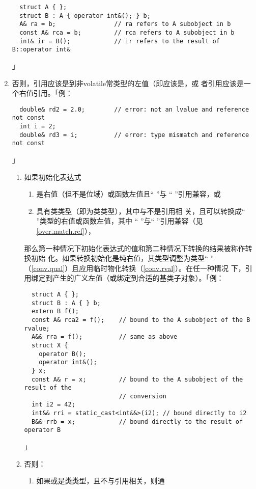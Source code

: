 \begin{enumerate}
{\begin{lstlisting}
  struct A { };
  struct B : A { operator int&(); } b;
  A& ra = b;                // ra refers to A subobject in b
  const A& rca = b;         // rca refers to A subobject in b
  int& ir = B();            // ir refers to the result of B::operator int&
\end{lstlisting}」}
  \item{否则，引用应该是到非volatile常类型的左值（即应该是，或
    者引用应该是一个右值引用。「例：
\begin{lstlisting}
  double& rd2 = 2.0;        // error: not an lvalue and reference not const
  int i = 2;
  double& rd3 = i;          // error: type mismatch and reference not const
\end{lstlisting}」
    \begin{enumerate}
      \item{如果初始化表达式
        \begin{enumerate}
          \item{是右值（但不是位域）或函数左值且`` ''与
            `` ''引用兼容，或}
          \item{具有类类型（即为类类型），其中与不是引用相
            关，且可以转换成`` ''类型的右值或函数左值，其中
            `` ''与`` ''引用兼容（见
            \ref{over.match.ref}），}
        \end{enumerate}
        那么第一种情况下初始化表达式的值和第二种情况下转换的结果被称作转换初始
        化。如果转换初始化是纯右值，其类型调整为类型`` ''
        （\ref{conv.qual}）且应用临时物化转换（\ref{conv.rval}）。在任一种情况
        下，引用绑定到产生的广义左值（或绑定到合适的基类子对象）。「例：
\begin{lstlisting}
  struct A { };
  struct B : A { } b;
  extern B f();
  const A& rca2 = f();    // bound to the A subobject of the B rvalue;
  A&& rra = f();          // same as above
  struct X {
    operator B();
    operator int&();
  } x;
  const A& r = x;         // bound to the A subobject of the result of the
                          // conversion
  int i2 = 42;
  int&& rri = static_cast<int&&>(i2); // bound directly to i2
  B&& rrb = x;            // bound directly to the result of operator B
\end{lstlisting}」}
      \item{否则：
        \begin{enumerate}
          \item{如果或是类类型，且不与引用相关，则通
}
\end{enumerate}}
\end{enumerate}}
\end{enumerate}
